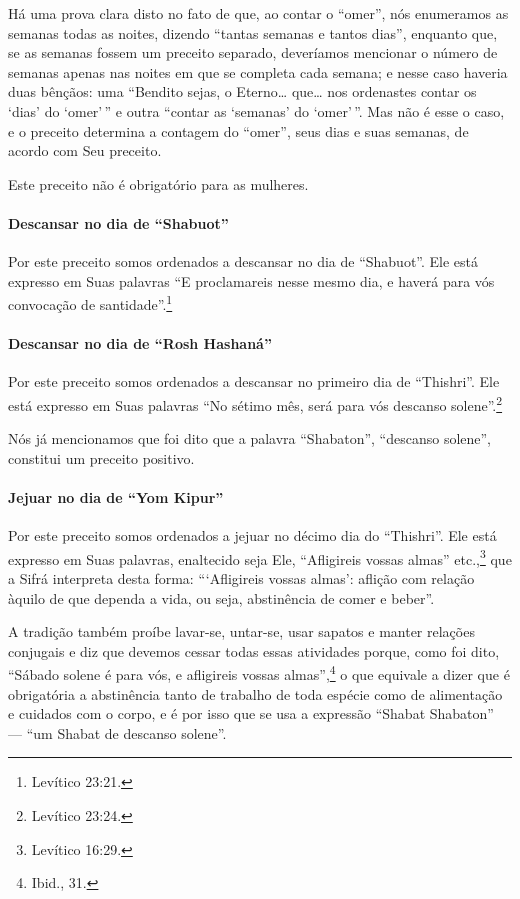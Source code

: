 Há uma prova clara disto no fato de que, ao contar o ``omer'', nós
enumeramos as semanas todas as noites, dizendo ``tantas semanas e tantos
dias'', enquanto que, se as semanas fossem um preceito separado,
deveríamos mencionar o número de semanas apenas nas noites em que se
completa cada semana; e nesse caso haveria duas bênçãos: uma ``Bendito
sejas, o Eterno\ldots{} que\ldots{} nos ordenastes contar os `dias' do `omer'\,''
e outra ``contar as `semanas' do `omer'\,''. Mas não é esse o caso, e o
preceito determina a contagem do ``omer'', seus dias e suas semanas, de
acordo com Seu preceito.

Este preceito não é obrigatório para as mulheres.

\paragraph{Descansar no dia de ``Shabuot''}

Por este preceito somos ordenados a descansar no dia de ``Shabuot''. Ele
está expresso em Suas palavras ``E proclamareis nesse mesmo dia, e
haverá para vós convocação de santidade''.\footnote{Levítico 23:21.}

\paragraph{Descansar no dia de ``Rosh Hashaná''}

Por este preceito somos ordenados a descansar no primeiro dia de
``Thishri''. Ele está expresso em Suas palavras ``No sétimo mês, será
para vós descanso solene''.\footnote{Levítico 23:24.}

Nós já mencionamos que foi dito que a palavra ``Shabaton'', ``descanso
solene'', constitui um preceito positivo.

\paragraph{Jejuar no dia de ``Yom Kipur''}

Por este preceito somos ordenados a jejuar no décimo dia do
``Thishri''. Ele está expresso em Suas palavras, enaltecido seja Ele,
``Afligireis vossas almas'' etc.,\footnote{Levítico 16:29.} que a Sifrá
interpreta desta forma: ```Afligireis vossas almas': aflição com relação àquilo de que dependa a vida, ou seja, abstinência de comer e beber''.

A tradição também proíbe lavar-se, untar-se, usar sapatos e manter
relações conjugais e diz que devemos cessar todas essas atividades
porque, como foi dito, ``Sábado solene é para vós, e afligireis vossas
almas'',\footnote{Ibid., 31.} o que equivale a dizer que é obrigatória a
abstinência tanto de trabalho de toda espécie como de alimentação e
cuidados com o corpo, e é por isso que se usa a expressão ``Shabat
Shabaton'' --- ``um Shabat de descanso solene''.


